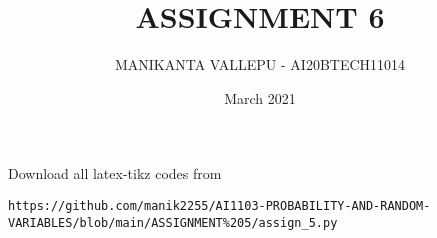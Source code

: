 \documentclass[journal,12pt,twocolumn]{IEEEtran}
\date{March 2021}
\DeclareMathOperator*{\Res}{Res}
\begin{document}
\newcommand{\BEQA}{\begin{eqnarray}}
\newcommand{\EEQA}{\end{eqnarray}}
\newcommand{\define}{\stackrel{\triangle}{=}}

\raggedbottom
\setlength{\parindent}{0pt}
\providecommand{\mbf}{\mathbf}
\providecommand{\pr}[1]{\ensuremath{\Pr\left(#1\right)}}
\providecommand{\qfunc}[1]{\ensuremath{Q\left(#1\right)}}
\providecommand{\fn}[1]{\ensuremath{f\left(#1\right)}}
\providecommand{\e}[1]{\ensuremath{E\left(#1\right)}}
\providecommand{\sbrak}[1]{\ensuremath{{}\left[#1\right]}}
\providecommand{\lsbrak}[1]{\ensuremath{{}\left[#1\right.}}
\providecommand{\rsbrak}[1]{\ensuremath{{}\left.#1\right]}}
\providecommand{\brak}[1]{\ensuremath{\left(#1\right)}}
\providecommand{\lbrak}[1]{\ensuremath{\left(#1\right.}}
\providecommand{\rbrak}[1]{\ensuremath{\left.#1\right)}}
\providecommand{\cbrak}[1]{\ensuremath{\left\{#1\right\}}}
\providecommand{\lcbrak}[1]{\ensuremath{\left\{#1\right.}}
\providecommand{\rcbrak}[1]{\ensuremath{\left.#1\right\}}}
\theoremstyle{remark}
\newtheorem{rem}{Remark}
\newcommand{\sgn}{\mathop{\mathrm{sgn}}}
\providecommand{\abs}[1]{\vert#1\vert}
\providecommand{\res}[1]{\Res\displaylimits_{#1}} 
\providecommand{\norm}[1]{\lVert#1\rVert}
\providecommand{\mtx}[1]{\mathbf{#1}}
\providecommand{\mean}[1]{E[ #1 ]}
\providecommand{\fourier}{\overset{\mathcal{F}}{ \rightleftharpoons}}
\providecommand{\system}{\overset{\mathcal{H}}{ \longleftrightarrow}}
\newcommand{\solution}{\noindent \textbf{Solution: }}
\newcommand{\cosec}{\,\text{cosec}\,}
\providecommand{\dec}[2]{\ensuremath{\overset{#1}{\underset{#2}{\gtrless}}}}
\newcommand{\myvec}[1]{\ensuremath{\begin{pmatrix}#1\end{pmatrix}}}
\newcommand{\mydet}[1]{\ensuremath{\begin{vmatrix}#1\end{vmatrix}}}
\makeatletter
\vspace{3cm}
\title{ASSIGNMENT 6}
\author{MANIKANTA VALLEPU - AI20BTECH11014}
\maketitle
\newpage
\bigskip
\renewcommand{\thetable}{\theenumi}
Download all latex-tikz codes from 
\begin{lstlisting}
https://github.com/manik2255/AI1103-PROBABILITY-AND-RANDOM-VARIABLES/blob/main/ASSIGNMENT%205/assign_5.py
\end{lstlisting}
\end{document}
